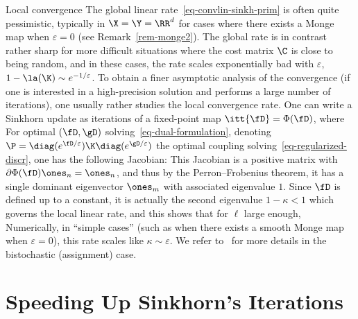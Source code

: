\begin{rem1}{Local convergence}\label{rem-local-conv}
The global linear rate~\eqref{eq-convlin-sinkh-prim} is often quite pessimistic, typically in $\X=\Y=\RR^d$ for cases where there exists a Monge map when $\varepsilon=0$ (see Remark~\ref{rem-monge2}). The global rate is in contrast rather sharp for more difficult situations where the cost matrix $\C$ is close to being random, and in these cases, the rate scales exponentially bad with $\varepsilon$, $1-\la(\K) \sim e^{-1/\varepsilon}$.
%
To obtain a finer asymptotic analysis of the convergence (\eg if one is interested in a high-precision solution and performs a large number of iterations), one usually rather studies the local convergence rate. 
%
One can write a Sinkhorn update as iterations of a fixed-point map $\itt{\fD} = \Phi( \it{\fD} )$, where
For optimal $(\fD,\gD)$ solving~\eqref{eq-dual-formulation}, denoting $\P = \diag(e^{\fD/\varepsilon}) \K \diag(e^{\gD/\varepsilon})$ the optimal coupling solving~\eqref{eq-regularized-discr}, one has the following Jacobian:
This Jacobian is a positive matrix with $\partial \Phi(\fD) \ones_n = \ones_n$, and thus by the Perron--Frobenius theorem, it has a single dominant eigenvector $\ones_m$ with associated eigenvalue $1$. Since $\fD$ is defined up to a constant, it is actually the second eigenvalue $1-\kappa<1$ which governs the local linear rate, and this shows that for $\ell$ large enough, 
%
Numerically, in ``simple cases'' (such as when there exists a smooth Monge map when $\varepsilon=0$), this rate scales like $\kappa \sim \varepsilon$. 
%
We refer to~\citep{knight2008sinkhorn} for more details in the bistochastic (assignment) case.
\end{rem1}






\section{Speeding Up Sinkhorn's Iterations}

